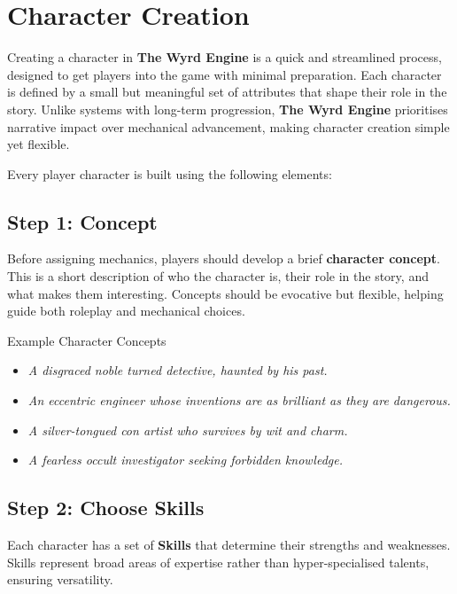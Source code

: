
\section{Character Creation}

Creating a character in \textbf{The Wyrd Engine} is a quick and streamlined process, designed to get players into the game with minimal preparation. Each character is defined by a small but meaningful set of attributes that shape their role in the story. Unlike systems with long-term progression, \textbf{The Wyrd Engine} prioritises narrative impact over mechanical advancement, making character creation simple yet flexible.

Every player character is built using the following elements:

\subsection{Step 1: Concept}

Before assigning mechanics, players should develop a brief \textbf{character concept}. This is a short description of who the character is, their role in the story, and what makes them interesting. Concepts should be evocative but flexible, helping guide both roleplay and mechanical choices.

\begin{DndSidebar}[float=!t]{Example Character Concepts}
    \begin{itemize}
        \item \emph{A disgraced noble turned detective, haunted by his past.}
        \item \emph{An eccentric engineer whose inventions are as brilliant as they are dangerous.}
        \item \emph{A silver-tongued con artist who survives by wit and charm.}
        \item \emph{A fearless occult investigator seeking forbidden knowledge.}
    \end{itemize}
\end{DndSidebar}

\subsection{Step 2: Choose Skills}

Each character has a set of \textbf{Skills} that determine their strengths and weaknesses. Skills represent broad areas of expertise rather than hyper-specialised talents, ensuring versatility.

